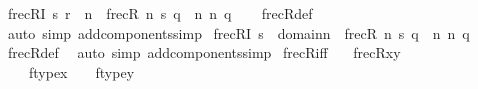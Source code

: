 \begin{isabellebody}
\endisatagproof
{\isafoldproof}%
%
\isadelimproof
\isanewline
%
\endisadelimproof
\isanewline
\isanewline
{}\isamarkupfalse%
\ frecRI{}{\isacharcolon}{\kern0pt}\ {\isachardoublequoteopen}{\isasymlangle}s{\isacharcomma}{\kern0pt}\ r{\isasymrangle}\ {\isasymin}\ n{}\ {\isasymLongrightarrow}\ frecR{\isacharparenleft}{\kern0pt}{\isasymlangle}{}{\isacharcomma}{\kern0pt}\ n{}{\isacharcomma}{\kern0pt}\ s{\isacharcomma}{\kern0pt}\ q{\isasymrangle}{\isacharcomma}{\kern0pt}\ {\isasymlangle}{}{\isacharcomma}{\kern0pt}\ n{}{\isacharcomma}{\kern0pt}\ n{}{\isacharcomma}{\kern0pt}\ q{\isacharprime}{\kern0pt}{\isasymrangle}{\isacharparenright}{\kern0pt}{\isachardoublequoteclose}\isanewline
%
\isadelimproof
\ \ %
\endisadelimproof
%
\isatagproof
{}\isamarkupfalse%
\ frecR{\isacharunderscore}{\kern0pt}def\ \isamarkupfalse%
\ {\isacharparenleft}{\kern0pt}auto\ simp\ add{\isacharcolon}{\kern0pt}components{\isacharunderscore}{\kern0pt}simp{\isacharparenright}{\kern0pt}%
\endisatagproof
{\isafoldproof}%
%
\isadelimproof
\isanewline
%
\endisadelimproof
\isanewline
{}\isamarkupfalse%
\ frecRI{}{\isacharprime}{\kern0pt}{\isacharcolon}{\kern0pt}\ {\isachardoublequoteopen}s\ {\isasymin}\ domain{\isacharparenleft}{\kern0pt}n{}{\isacharparenright}{\kern0pt}\ {\isasymLongrightarrow}\ frecR{\isacharparenleft}{\kern0pt}{\isasymlangle}{}{\isacharcomma}{\kern0pt}\ n{}{\isacharcomma}{\kern0pt}\ s{\isacharcomma}{\kern0pt}\ q{\isasymrangle}{\isacharcomma}{\kern0pt}\ {\isasymlangle}{}{\isacharcomma}{\kern0pt}\ n{}{\isacharcomma}{\kern0pt}\ n{}{\isacharcomma}{\kern0pt}\ q{\isacharprime}{\kern0pt}{\isasymrangle}{\isacharparenright}{\kern0pt}{\isachardoublequoteclose}\isanewline
%
\isadelimproof
\ \ %
\endisadelimproof
%
\isatagproof
{}\isamarkupfalse%
\ frecR{\isacharunderscore}{\kern0pt}def\ \isamarkupfalse%
\ {\isacharparenleft}{\kern0pt}auto\ simp\ add{\isacharcolon}{\kern0pt}components{\isacharunderscore}{\kern0pt}simp{\isacharparenright}{\kern0pt}%
\endisatagproof
{\isafoldproof}%
%
\isadelimproof
\isanewline
%
\endisadelimproof
\isanewline
{}\isamarkupfalse%
\ frecR{\isacharunderscore}{\kern0pt}iff\ {\isacharcolon}{\kern0pt}\isanewline
\ \ {\isachardoublequoteopen}frecR{\isacharparenleft}{\kern0pt}x{\isacharcomma}{\kern0pt}y{\isacharparenright}{\kern0pt}\ {\isasymlongleftrightarrow}\isanewline
\ \ \ \ {\isacharparenleft}{\kern0pt}ftype{\isacharparenleft}{\kern0pt}x{\isacharparenright}{\kern0pt}\ {\isacharequal}{\kern0pt}\ {}\ {\isasymand}\ ftype{\isacharparenleft}{\kern0pt}y{\isacharparenright}{\kern0pt}\ {\isacharequal}{\kern0pt}\ {}\ \isanewline

\end{isabellebody}
